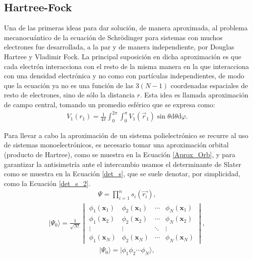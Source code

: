 \subsection{Hartree-Fock}

Una de las primeras ideas para dar solución, de manera aproximada, al problema
mecanocuántico de la ecuación de Schr\"odinger para sistemas con muchos
electrones fue desarrollada, a la par y de manera independiente, por Douglas
Hartree y Vladimir Fock. La principal suposición en dicha aproximación es que
cada electrón interacciona con el resto de la misma manera en la que
interacciona con una densidad electrónica y no como con partículas
independientes, de modo que la ecuación ya no es una función de las $3(N-1)$
coordenadas espaciales de resto de electrones, sino de sólo la distancia $r$.
Esta idea es llamada aproximación de campo central, tomando un promedio
esférico que se expresa como:
%
\begin{align}
V_{1}(r_{1})=\frac{1}{4\pi}\int_{0}^{2\pi}\int_{0}^{\pi} V_{1}(\vec{r}_1)\sin\theta
\mathrm{d}\theta \mathrm{d}\varphi.
\end{align}

Para llevar a cabo la aproximación de un sistema polielectrónico se recurre al
uso de sistemas monoelectrónicos, es necesario tomar una aproximación orbital
(producto de Hartree), como se muestra en la Ecuación \ref{Aprox_Orb}, y para
garantizar la antisimetría ante el intercambio usamos el determinante de Slater
como se muestra en la Ecuación \ref{det_s}, que se suele denotar, por
simplicidad, como la Ecuación \ref{det_s_2}.
%
\begin{align}
  \Psi = \prod_{i=1}^{n} s_i (\vec{r_i}) ,
\label{Aprox_Orb}
\end{align}
\begin{align}
  |\Psi_0\rangle = \frac{1}{\sqrt{N!}}
  \begin{vmatrix}
    \phi_{1}(\mathbf{x}_1) & \phi_{2}(\mathbf{x}_1) & \cdots & \phi_{N}(\mathbf{x}_1) \\
    \phi_{1}(\mathbf{x}_2) & \phi_{2}(\mathbf{x}_2) & \cdots & \phi_{N}(\mathbf{x}_2) \\
    \vdots & \vdots & \ddots & \vdots \\
    \phi_{1}(\mathbf{x}_N) & \phi_{2}(\mathbf{x}_N) & \cdots & \phi_{N}(\mathbf{x}_N)
  \end{vmatrix} ,
\label{det_s}
\end{align}
%
\begin{align}
  |\Psi_0\rangle = |\phi_{1}\phi_{2} \cdots \phi_{N} \rangle ,
\label{det_s_2}
\end{align}

